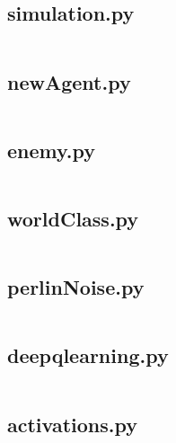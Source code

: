 \begin{flushleft}
        \label{sec:simulation.py}
        \subsection{simulation.py}
        \inputminted[frame=leftline,framesep=2mm,baselinestretch=1.2,fontsize=\small,linenos,breaklines]{python}{../Scripts/simulation.py}

        \label{sec:newAgent.py}
        \subsection{newAgent.py}
        \inputminted[frame=leftline,framesep=2mm,baselinestretch=1.2,fontsize=\small,linenos,breaklines]{python}{../Scripts/newAgent.py}

        \label{sec:enemy.py}
        \subsection{enemy.py}
        \inputminted[frame=leftline,framesep=2mm,baselinestretch=1.2,fontsize=\small,linenos,breaklines]{python}{../Scripts/enemy.py}

        \label{sec:worldClass.py}
        \subsection{worldClass.py}
        \inputminted[frame=leftline,framesep=2mm,baselinestretch=1.2,fontsize=\small,linenos,breaklines]{python}{../Scripts/worldClass.py}

        \label{sec:perlinNoise.py}
        \subsection{perlinNoise.py}
        \inputminted[frame=leftline,framesep=2mm,baselinestretch=1.2,fontsize=\small,linenos,breaklines]{python}{../Scripts/perlinNoise.py}

        \label{sec:deepqlearning.py}
        \subsection{deepqlearning.py}
        \inputminted[frame=leftline,framesep=2mm,baselinestretch=1.2,fontsize=\small,linenos,breaklines]{python}{../Scripts/deepqlearning.py}

        \label{sec:activations.py}
        \subsection{activations.py}
        \inputminted[frame=leftline,framesep=2mm,baselinestretch=1.2,fontsize=\small,linenos,breaklines]{python}{../Scripts/activations.py}


\end{flushleft}
